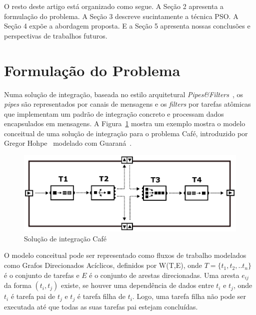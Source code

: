 \documentclass[sigconf]{acmart}
\begin{document}
 O resto deste artigo está organizado como segue. A Seção 2 apresenta a formulação do problema. A Seção 3 descreve sucintamente a técnica PSO. A Seção 4 expõe a abordagem proposta. E a Seção 5 apresenta nossas conclusões e perspectivas de trabalhos futuros. 
 \section{Formula\c{c}\~{a}o do Problema}
 \label{sec:formulacao_problema}
 Numa solução de integração, baseada no estilo arquitetural \emph{Pipes\&Filters}~\cite{alexander1977}, os \textit{pipes} são representados por canais de mensagens e os \textit{filters} por tarefas atômicas que implementam um padrão de integração concreto e processam dados encapsulados em mensagens.
 A Figura~\ref{fig:sample-cafe} mostra um exemplo mostra o modelo conceitual de uma solução de integração para o problema Café, introduzido por Gregor Hohpe~\cite{hohpe2005} modelado com Guaraná~\cite{frantz2016}.
 \begin{figure}[htb]
 	\centering
 	\includegraphics[scale=0.25]{./figs/cafe-guarana.png}
 	\caption{Solução de integração Café}
 	\label{fig:sample-cafe}
 \end{figure}
 O modelo conceitual pode ser representado como fluxos de trabalho modelados como Grafos Direcionados Acíclicos, definidos por W(T,E), onde $T = \{t_1,t_2,..t_n\}$ é o conjunto de tarefas e $E$ é o conjunto de arestas direcionadas. Uma aresta $e_{ij}$ da forma $({t_i},{t_j})$ existe, se houver uma dependência de dados entre $t_i$ e $t_j$, onde $t_i$ é tarefa pai de $t_j$ e $t_j$ é tarefa filha de $t_i$. Logo, uma tarefa filha não pode ser executada até que todas as suas tarefas pai estejam concluídas. 
\end{document}
